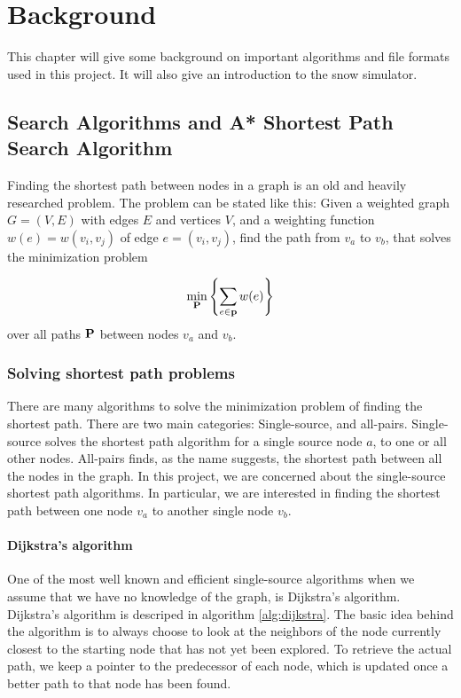 \chapter{Background}
This chapter will give some background on important algorithms and file formats used in this project. It will also give an introduction to the snow simulator.

\section{Search Algorithms and A* Shortest Path Search Algorithm}
Finding the shortest path between nodes in a graph is an old and heavily researched problem. The problem can be stated like this: Given a weighted graph $G = (V,E)$ with edges $E$ and vertices $V$, and a weighting function $w(e) = w(v_i, v_j)$ of edge $e = (v_i, v_j)$, find the path from $v_a$ to $v_b$, that solves the minimization problem

\begin{equation}
\min_{\mathbf P} \left\{ \sum_{e\in \mathbf{p}} w(e) \right\}
\end{equation}
over all paths $\mathbf P$ between nodes $v_a$ and $v_b$.

\subsection{Solving shortest path problems}
There are many algorithms to solve the minimization problem of finding the shortest path. There are two main categories: Single-source, and all-pairs. Single-source solves the shortest path algorithm for a single source node $a$, to one or all other nodes. All-pairs finds, as the name suggests, the shortest path between all the nodes in the graph. In this project, we are concerned about the single-source shortest path algorithms. In particular, we are interested in finding the shortest path between one node $v_a$ to another single node $v_b$.

\subsubsection{Dijkstra's algorithm}
One of the most well known and efficient single-source algorithms when we assume that we have no knowledge of the graph, is Dijkstra's algorithm. Dijkstra's algorithm is descriped in algorithm \ref{alg:dijkstra}. The basic idea behind the algorithm is to always choose to look at the neighbors of the node currently closest to the starting node that has not yet been explored. To retrieve the actual path, we keep a pointer to the predecessor of each node, which is updated once a better path to that node has been found. 

